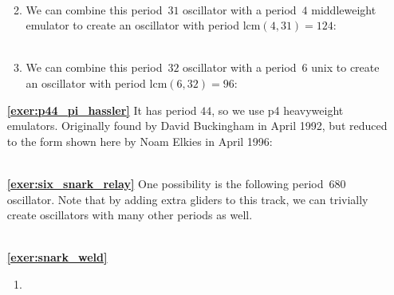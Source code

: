\begin{multicols}{2}
\begin{itemize}[leftmargin=0em]
\begin{enumerate}[leftmargin=1.5em,label=\bf\color{ocre}(\alph*)]
			 \\
			
			\item We can combine this period~$31$ oscillator with a period~$4$ middleweight emulator to create an oscillator with period $\mathrm{lcm}(4,31) = 124$:  \\[-0.6em]
			
			 \\
			
			\item We can combine this period~$32$ oscillator with a period~$6$ unix to create an oscillator with period $\mathrm{lcm}(6,32) = 96$: \\[-0.6em]
			
		\end{enumerate}
	

		\item[\bf\color{ocre}\sffamily\ref{exer:p44_pi_hassler}] It has period $44$, so we use p4 heavyweight emulators. Originally found by David Buckingham in April 1992, but reduced to the form shown here by Noam Elkies in April 1996:\\[-0.6em]
		
		 \\
		
		
		\item[\bf\color{ocre}\sffamily\ref{exer:six_snark_relay}] One possibility is the following period~$680$ oscillator. Note that by adding extra gliders to this track, we can trivially create oscillators with many other periods as well. \\[-0.6em]
		
		 \\
		
		
		\item[\bf\color{ocre}\sffamily\ref{exer:snark_weld}]
		\begin{enumerate}[leftmargin=1.5em,label=\bf\color{ocre}(\alph*)]
			\item {}
			

\end{enumerate}
\end{itemize}
\end{multicols}
